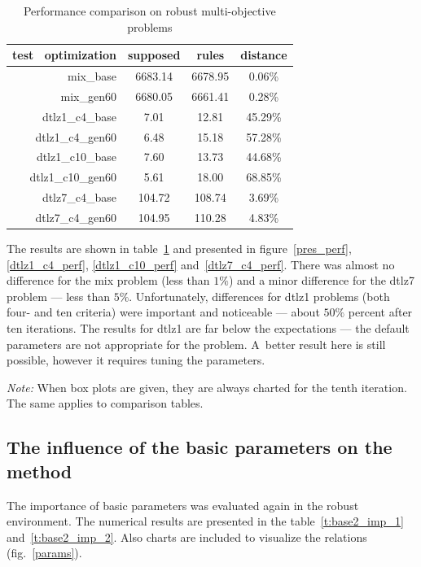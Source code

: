 \begin{table}
  \centering
  \begin{tabular}{r c c c}
    \hline
    test \ optimization & supposed & rules & distance \\
    \hline
    \hline
    mix\_base & 6683.14 & 6678.95 & 0.06\% \\
    mix\_gen60 & 6680.05 & 6661.41 & 0.28\% \\
    dtlz1\_c4\_base & 7.01 & 12.81 & 45.29\% \\
    dtlz1\_c4\_gen60 & 6.48 & 15.18 & 57.28\% \\
    dtlz1\_c10\_base & 7.60 & 13.73 & 44.68\% \\
    dtlz1\_c10\_gen60 & 5.61 & 18.00 & 68.85\% \\
    dtlz7\_c4\_base & 104.72 & 108.74 & 3.69\% \\
    dtlz7\_c4\_gen60 & 104.95 & 110.28 & 4.83\% \\
    \hline
  \end{tabular}
  \caption{Performance comparison on robust multi-objective problems}
  \label{t:perf-comp}
\end{table}

The results are shown in table~\ref{t:perf-comp} and presented in
figure~\ref{pres_perf}, \ref{dtlz1_c4_perf}, \ref{dtlz1_c10_perf}
and~\ref{dtlz7_c4_perf}. There was almost no difference for the mix problem
(less than $1\%$) and a minor difference for the dtlz7 problem --- less than
$5\%$. Unfortunately, differences for dtlz1 problems (both four- and ten
criteria) were important and noticeable --- about $50\%$ percent after ten
iterations. The results for dtlz1 are far below the expectations --- the
default parameters are not appropriate for the problem. A~better result here
is still possible, however it requires tuning the parameters.

\textit{Note:} When box plots are given, they are always charted for the tenth
iteration. The same applies to comparison tables.

 \clearpage{}

\subsection{The influence of the basic parameters on the method}

The importance of basic parameters was evaluated again in the robust
environment. The numerical results are presented in the
table~\ref{t:base2_imp_1} and~\ref{t:base2_imp_2}. Also charts are included to
visualize the relations (fig.~\ref{params}).


